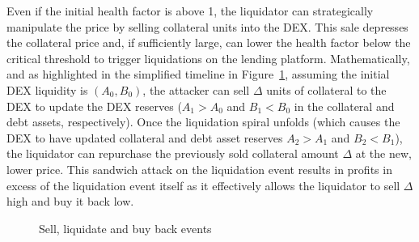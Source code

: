 \documentclass[11pt]{article} %
\begin{document}
Even if the initial health factor is above 1, the liquidator can strategically manipulate the price by selling collateral units into the DEX. 
This sale depresses the collateral price and, if sufficiently large, can lower the health factor below the critical threshold to trigger liquidations on the lending platform. 
Mathematically, and as highlighted in the simplified timeline in Figure~\ref{fig:three_steps}, assuming the initial DEX liquidity is $(A_0,B_0)$, the attacker can sell $\Delta$ units of collateral to the DEX to update the DEX reserves ($A_1 > A_0$ and $B_1 < B_0$ in the collateral and debt assets, respectively). 
Once the liquidation spiral unfolds (which causes the DEX to have updated collateral and debt asset reserves $A_2 > A_1$ and $B_2 < B_1$), the liquidator can repurchase the previously sold collateral amount $\Delta$ at the new, lower price. This sandwich attack on the liquidation event results in profits in excess of the liquidation event itself as it effectively allows the liquidator to sell $\Delta$ high and buy it back low. 
%
\begin{figure}[!tb]
\centering
{} %
\caption{\footnotesize{Sell, liquidate and buy back events}}
\label{fig:three_steps}
\end{figure}
\end{document}

